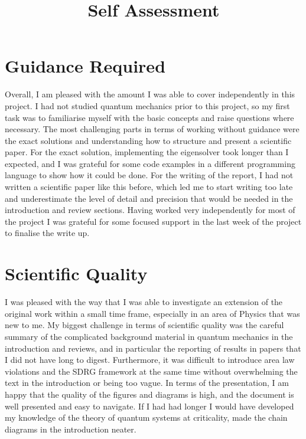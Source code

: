 \documentclass[11pt]{article}
\title{Self Assessment}
\date{}
\begin{document}
\maketitle
\section{Guidance Required}
Overall, I am pleased with the amount I was able to cover independently in this project. I had not studied quantum mechanics prior to this project, so my first task was to familiarise myself with the basic concepts and raise questions where necessary. The most challenging parts in terms of working without guidance were the exact solutions and understanding how to structure and present a scientific paper. For the exact solution, implementing the eigensolver took longer than I expected, and I was grateful for some code examples in a different programming language to show how it could be done. For the writing of the report, I had not written a scientific paper like this before, which led me to start writing too late and underestimate the level of detail and precision that would be needed in the introduction and review sections. Having worked very independently for most of the project I was grateful for some focused support in the last week of the project to finalise the write up. 

\section{Scientific Quality}
I was pleased with the way that I was able to investigate an extension of the original work within a small time frame, especially in an area of Physics that was new to me. My biggest challenge in terms of scientific quality was the careful summary of the complicated background material in quantum mechanics in the introduction and reviews, and in particular the reporting of results in papers that I did not have long to digest. Furthermore, it was difficult to introduce area law violations and the SDRG framework at the same time without overwhelming the text in the introduction or being too vague. In terms of the presentation, I am happy that the quality of the figures and diagrams is high, and the document is well presented and easy to navigate. If I had had longer I would have developed my knowledge of the theory of quantum systems at criticality, made the chain diagrams in the introduction neater.
\end{document}
